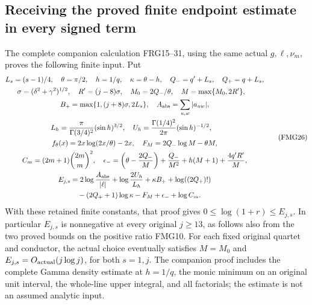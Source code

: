 \documentclass[11pt,a4paper]{article}
\begin{document}
\subsection{Receiving the proved finite endpoint estimate in every signed term}
The complete companion calculation FRG15--31, using the same actual
$g,\ell,\nu_m$, proves the following finite input. Put
\[
\begin{gathered}
 L_s=(s-1)/4,\quad \theta=\pi/2,\quad h=1/q,\quad
 \kappa=\theta-h,\quad Q_-=q'+L_s,\quad Q_+=q+L_s,\\
 \sigma=(\delta^2+\gamma^2)^{1/2},\quad R'=(j-8)\sigma,
 \quad M_0=2Q_-/\theta,\quad M=\max\{M_0,2R'\},\quad\\
 B_+=\max\{1,(j+8)\sigma,2L_s\},\quad
 A_{\rm abs}=\sum_{u,w}|a_{uw}|,\\
 L_h=\frac{\pi}{\Gamma(3/4)^2}(\sin h)^{3/2},\quad
 U_h=\frac{\Gamma(1/4)^2}{2\pi}(\sin h)^{-1/2},\quad\\
 f_\theta(x)=2x\log(2x/\theta)-2x,\quad
 F_M=2Q_-\log M-\theta M,\\
 C_m=(2m+1)\binom{2m}{m}^{2},\quad
 \epsilon_-=\left(\theta-\frac{2Q_-}M\right)
       +\frac{Q_-}{M^2}+h(M+1)+\frac{4q'R'}M,\\
 \begin{aligned}
 E_{j,s}&=2\log\frac{A_{\rm abs}}{|\ell|}
 +\log\frac{2U_h}{L_h}+\kappa B_++\log((2Q_+)!)\\
 &\quad -(2Q_++1)\log\kappa-F_M+\epsilon_-+\log C_m.
 \end{aligned}
\end{gathered}                                                   \tag{FMG26}
\]
With these retained finite constants, that proof gives
$0\le\log(1+r)\le E_{j,s}$. In particular $E_{j,s}$ is nonnegative
at every original $j\ge13$, as follows also from the two proved bounds on the
positive ratio FMG10. For each fixed original quartet and conductor,
the actual choice eventually satisfies $M=M_0$ and
$E_{j,s}=O_{\rm actual}(j\log j)$,
for both $s=1,j$. The companion proof includes the complete Gamma
density estimate at $h=1/q$, the monic minimum on an original
unit interval, the whole-line upper integral, and all factorials;
the estimate is not an assumed analytic input.
\end{document}
